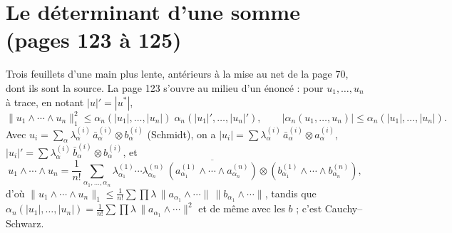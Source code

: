 \documentclass[11pt,a4paper]{article}
\begin{document}
\section*{Le déterminant d'une somme (pages 123 à 125)}

Trois feuillets d'une main plus lente, antérieurs à la mise au net de la
page 70, dont ils sont la source. La page 123 s'ouvre au milieu d'un
énoncé : pour $u_1, \ldots, u_n$ à trace, en notant $|u|' = |u^{*}|$,
\[
  \|u_1 \wedge \cdots \wedge u_n\|_1^2 \leq \alpha_n(|u_1|, \ldots, |u_n|)\;
  \alpha_n(|u_1|', \ldots, |u_n|'), \qquad
  |\alpha_n(u_1, \ldots, u_n)| \leq \alpha_n(|u_1|, \ldots, |u_n|) .
\]
Avec $u_i = \sum_\alpha \lambda^{(i)}_\alpha\,\bar{a}^{(i)}_\alpha \otimes
b^{(i)}_\alpha$ (Schmidt), on a $|u_i| = \sum \lambda^{(i)}_\alpha\,
\bar{a}^{(i)}_\alpha \otimes a^{(i)}_\alpha$, $|u_i|' = \sum \lambda^{(i)}_\alpha\,
\bar{b}^{(i)}_\alpha \otimes b^{(i)}_\alpha$, et
\[
  u_1 \wedge \cdots \wedge u_n = \frac{1}{n!}\sum_{\alpha_1, \ldots, \alpha_n}
  \lambda^{(1)}_{\alpha_1} \cdots \lambda^{(n)}_{\alpha_n}\,
  \overline{(a^{(1)}_{\alpha_1} \wedge \cdots \wedge a^{(n)}_{\alpha_n})} \otimes
  (b^{(1)}_{\alpha_1} \wedge \cdots \wedge b^{(n)}_{\alpha_n}),
\]
d'où $\|u_1 \wedge \cdots \wedge u_n\|_1 \leq \frac{1}{n!}\sum \prod
\lambda\,\|a_{\alpha_1} \wedge \cdots\|\,\|b_{\alpha_1} \wedge \cdots\|$,
tandis que $\alpha_n(|u_1|, \ldots, |u_n|) = \frac{1}{n!}\sum \prod\lambda\,
\|a_{\alpha_1} \wedge \cdots\|^2$ et de même avec les $b$ ; c'est
Cauchy--Schwarz.
\end{document}
